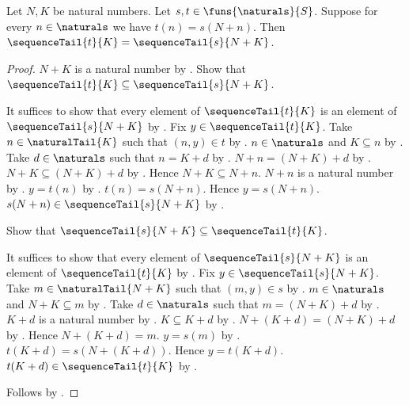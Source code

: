 \begin{theorem}\label{finite_shift_sequence_tail}
    Let $N,K$ be natural numbers.
    Let $s,t\in\funs{\naturals}{S}$.
    Suppose for every $n\in\naturals$ we have $t(n)=s(N+n)$.
    Then $\sequenceTail{t}{K}=\sequenceTail{s}{N+K}$.
\end{theorem}
\begin{proof}
    $N+K$ is a natural number by .
    Show that $\sequenceTail{t}{K}\subseteq\sequenceTail{s}{N+K}$.
    \begin{subproof}
        It suffices to show that every element of $\sequenceTail{t}{K}$
            is an element of $\sequenceTail{s}{N+K}$ by .
        Fix $y\in\sequenceTail{t}{K}$.
        Take $n\in\naturalTail{K}$ such that $(n,y)\in t$
            by .
        $n\in\naturals$ and $K\subseteq n$ by .
        Take $d\in\naturals$ such that $n=K+d$
            by .
        $N+n=(N+K)+d$ by .
        $N+K\subseteq(N+K)+d$
            by .
        Hence $N+K\subseteq N+n$.
        $N+n$ is a natural number by .
        $y=t(n)$ by .
        $t(n)=s(N+n)$.
        Hence $y=s(N+n)$.
        $s(N+n)\in\sequenceTail{s}{N+K}$
            by .
    \end{subproof}

    Show that $\sequenceTail{s}{N+K}\subseteq\sequenceTail{t}{K}$.
    \begin{subproof}
        It suffices to show that every element of $\sequenceTail{s}{N+K}$
            is an element of $\sequenceTail{t}{K}$ by .
        Fix $y\in\sequenceTail{s}{N+K}$.
        Take $m\in\naturalTail{N+K}$ such that $(m,y)\in s$
            by .
        $m\in\naturals$ and $N+K\subseteq m$
            by .
        Take $d\in\naturals$ such that $m=(N+K)+d$
            by .
        $K+d$ is a natural number by .
        $K\subseteq K+d$ by .
        $N+(K+d)=(N+K)+d$ by .
        Hence $N+(K+d)=m$.
        $y=s(m)$ by .
        $t(K+d)=s(N+(K+d))$.
        Hence $y=t(K+d)$.
        $t(K+d)\in\sequenceTail{t}{K}$
            by .
    \end{subproof}
    Follows by .
\end{proof}

